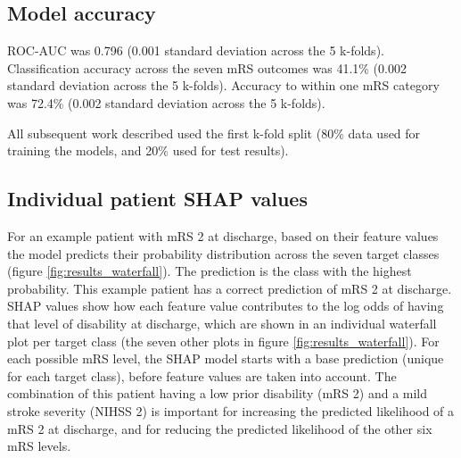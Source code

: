 
\subsection{Model accuracy}

ROC-AUC was 0.796 (0.001 standard deviation across the 5 k-folds). Classification accuracy across the seven mRS outcomes was 41.1\% (0.002 standard deviation across the 5 k-folds). Accuracy to within one mRS category was 72.4\% (0.002 standard deviation across the 5 k-folds).  

All subsequent work described used the first k-fold split (80\% data used for training the models, and 20\% used for test results).


\subsection{Individual patient SHAP values}

For an example patient with mRS 2 at discharge, based on their feature values the model predicts their probability distribution across the seven target classes (figure \ref{fig:results_waterfall}). The prediction is the class with the highest probability. This example patient has a correct prediction of mRS 2 at discharge. SHAP values show how each feature value contributes to the log odds of having that level of disability at discharge, which are shown in an individual waterfall plot per target class (the seven other plots in figure \ref{fig:results_waterfall}). For each possible mRS level, the SHAP model starts with a base prediction (unique for each target class), before feature values are taken into account. The combination of this patient having a low prior disability (mRS 2) and a mild stroke severity (NIHSS 2) is important for increasing the predicted likelihood of a mRS 2 at discharge, and for reducing the predicted likelihood of the other six mRS levels.

